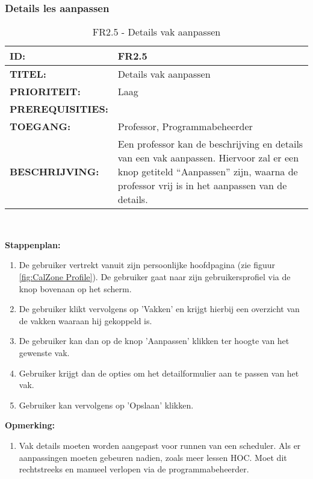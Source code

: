         
\subsubsection{Details les aanpassen} 
\noindent\begin{table}[H]
            \begin{tabular}{l | p{10cm}}
                \textbf{ID:} & FR2.5 \\ \hline
                \textbf{TITEL:} & Details vak aanpassen\\ \hline
                \textbf{PRIORITEIT:} &  Laag \\ \hline
                \textbf{PREREQUISITIES:} & \\ \hline
                \textbf{TOEGANG:} & Professor, Programmabeheerder \\ \hline
                \textbf{BESCHRIJVING:} & Een professor kan de beschrijving en details van een vak aanpassen. Hiervoor zal er een knop getiteld “Aanpassen” zijn, waarna de professor vrij is in het aanpassen van de details. \\ 
            \end{tabular}\\
            \caption{FR2.5 - Details vak aanpassen}
            \label{tab:FR2.5 - Details vak aanpassen}
        \end{table}	
        
\textbf{Stappenplan:}
	\begin{enumerate}
	\item De gebruiker vertrekt vanuit zijn persoonlijke hoofdpagina (zie figuur \ref{fig:CalZone Profile}). De gebruiker gaat naar zijn gebruikersprofiel via de knop bovenaan op het scherm.
	\item De gebruiker klikt vervolgens op 'Vakken' en krijgt hierbij een overzicht van de vakken waaraan hij gekoppeld is.
	\item De gebruiker kan dan op de knop 'Aanpassen' klikken ter hoogte van het gewenste vak.
	\item Gebruiker krijgt dan de opties om het detailformulier aan te passen van het vak.
	\item Gebruiker kan vervolgens op 'Opslaan' klikken.
	\end{enumerate}

\textbf{Opmerking:}
	\begin{enumerate}
	\item Vak details moeten worden aangepast voor runnen van een scheduler. Als er aanpassingen moeten gebeuren nadien, zoals meer lessen HOC. Moet dit rechtstreeks en manueel verlopen via de programmabeheerder.
	\end{enumerate}
        
